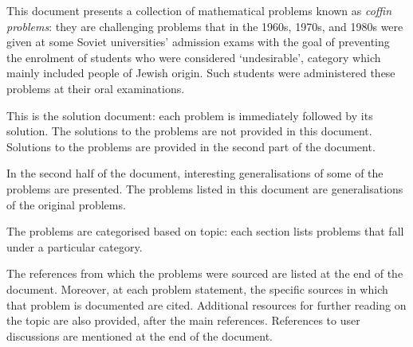 
This document presents a collection of mathematical problems known as \emph{coffin problems}:
they are challenging problems that in the 1960s, 1970s, and 1980s
were given at some Soviet universities' admission exams
with the goal of preventing the enrolment of students who were considered `undesirable',
category which mainly included people of Jewish origin.
Such students were administered these problems at their oral examinations.

\ifdefined\ONLYSOLUTIONS
  \ifdefined\NOSOLUTIONS
  \else
    This is the solution document: each problem is immediately followed by its solution.
  \fi
\else
  \ifdefined\NOSOLUTIONS
    The solutions to the problems are not provided in this document.
  \else
    Solutions to the problems are provided in the second part of the document.
  \fi
\fi

\ifdefined\GENERALISED
  \ifdefined\ORIGINAL
    In the second half of the document, interesting generalisations of some of the problems are presented.
  \else
    The problems listed in this document are generalisations of the original problems.
  \fi
\fi

\ifdefined\UNCATEGORISED
\else
  The problems are categorised based on topic:
  each section lists problems that fall under a particular category.
\fi

The references from which the problems were sourced are listed at the end of the document.
\ifdefined\NOSOURCES%
\else%
  Moreover, at each problem statement, the specific sources in which that problem is documented are cited.
\fi%
\ifdefined\MOREREFS%
  Additional resources for further reading on the topic are also provided, after the main references.
\fi%
\ifdefined\FORUMREFS%
  References to user discussions are mentioned at the end of the document.
\fi
